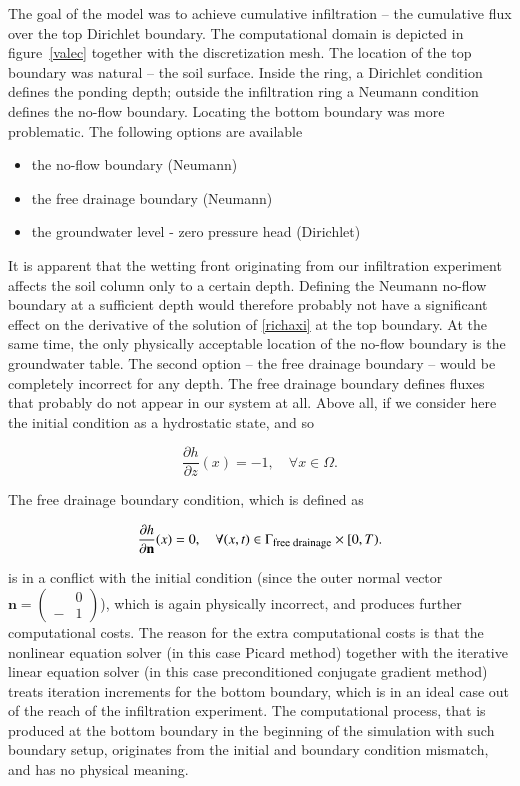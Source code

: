 \documentclass[review]{elsarticle}
\newenvironment{lineq}
    {\begin{linenomath*}
    \begin{equation}
    }
    { 
    \end{equation} 
    \end{linenomath*}
    }
\renewcommand{\vec}{\mathbf}
\begin{document}
The goal of the model was to achieve cumulative infiltration -- the cumulative flux over the top Dirichlet boundary.
The computational domain is depicted in figure~\ref{valec} together with the discretization mesh. The location of the top boundary was natural -- the soil surface. Inside the ring, a Dirichlet condition defines the ponding depth; outside the infiltration ring a Neumann condition defines the no-flow boundary. Locating the bottom boundary was more problematic. The following options are available
\begin{itemize}
\item the no-flow boundary (Neumann)
\item the free drainage boundary (Neumann)
\item the groundwater level - zero pressure head (Dirichlet)
\end{itemize}
It is apparent that the wetting front originating from our infiltration experiment affects the soil column only to a certain depth. Defining the Neumann no-flow boundary at a sufficient depth would therefore probably not have a significant effect on the derivative of the solution of \eqref{richaxi} at the top boundary. At the same time, the only physically acceptable location of the no-flow boundary is the groundwater table. The second option -- the free drainage boundary -- would be completely incorrect for any depth. The free drainage boundary defines fluxes that probably do not appear in our system at all. Above all, if we consider here the initial condition  as a hydrostatic state, and so \begin{lineq} \frac{\partial h}{\partial z}(x) = -1, \quad \forall x \in \Omega .\end{lineq} The free drainage boundary condition, which is defined as
\begin{lineq}
\frac{\partial h}{\partial \vec{n}}(x) = 0, \quad \forall (x,t) \in \Gamma_{\mbox{\footnotesize free drainage}} \times [0,T).
\end{lineq}
is in a conflict with the initial condition (since the outer normal vector $\vec{n} = \left(\begin{smallmatrix} &0 \\ -&1 \end{smallmatrix} \right)$), which is again physically incorrect, and produces further computational costs. The reason for the extra computational costs is that the nonlinear equation solver (in this case Picard method) together with the iterative linear equation solver (in this case preconditioned conjugate gradient method)  treats iteration increments for the bottom boundary, which is in an ideal case out of the reach of the infiltration experiment. The computational process, that is produced at the bottom boundary in the beginning of the simulation with such boundary setup, originates from the initial and boundary condition mismatch, and has no physical meaning.
\end{document}
